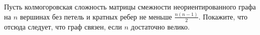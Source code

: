 Пусть колмогоровская сложность матрицы смежности неориентированного графа на $n$ вершинах без петель и
кратных ребер не меньше $\frac{n (n - 1)}{2}$. Покажите, что отсюда следует, что граф связен, если $n$
достаточно велико.
